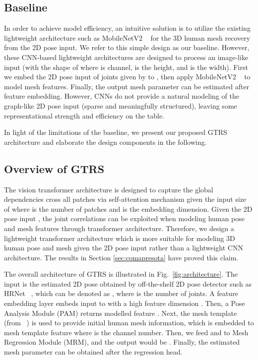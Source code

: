 \documentclass[sigconf]{acmart}
\begin{document}
\subsection{Baseline}
\label{sec:Baseline}
In order to achieve model efficiency, an intuitive solution is to utilize the existing lightweight architecture such as MobileNetV2 ~\cite{mobilenetv2} for the 3D human mesh recovery from the 2D pose input. We refer to this simple design as our baseline. However, these CNN-based lightweight architectures are designed to process an image-like input (with the shape of  where  is channel,  is the height, and  is the width). First we embed the 2D pose input of  joints given by  to  , then apply MobileNetV2 ~\cite{mobilenetv2} to model mesh features. Finally, the output mesh parameter  can be estimated after feature embedding.   
However, CNNs do not provide a natural modeling of the graph-like 2D pose input (sparse and meaningfully structured), leaving some representational strength and efficiency on the table.

In light of the limitations of the baseline, we present our proposed GTRS architecture and elaborate the design components in the following.
\subsection{Overview of GTRS}

The vision transformer architecture is designed to capture the global dependencies cross all patches via self-attention mechanism given the input size of  where  is the number of patches and  is the embedding dimension. Given the 2D pose input  , the joint correlations can be exploited when modeling human pose and mesh features through transformer architecture. Therefore, we design a lightweight transformer architecture which is more suitable for modeling 3D human pose and mesh given the 2D pose input rather than a lightweight CNN architecture. The results in Section \ref{sec:comapresota} have proved this claim. 

The overall architecture of GTRS is illustrated in Fig.~\ref{fig:architecture}. The input is the estimated 2D pose obtained by off-the-shelf 2D pose detector such as HRNet ~\cite{hrnet}, which can be denoted as , where  is the number of joints. A feature embedding layer embeds input  to  with a high feature dimension . Then, a Pose Analysis Module (PAM) returns modelled feature . Next, the mesh template   (from ~\cite{Kolotouros2019SPIN}) is used to provide initial human mesh information, which is embedded to mesh template feature  where  is the channel number. 
Then, we feed  and  to Mesh Regression Module (MRM), and the output would be . Finally, the estimated mesh parameter  can be obtained after the regression head.  
\end{document}
